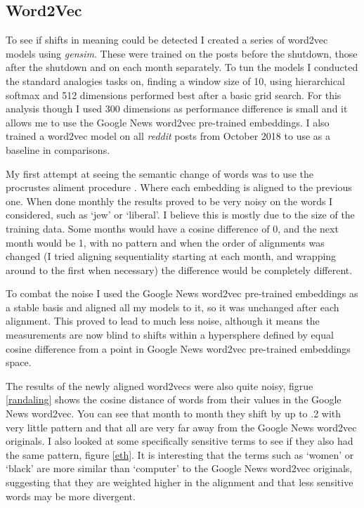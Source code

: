\documentclass[letterpaper]{article}
\begin{document}
\subsection{Word2Vec}

To see if shifts in meaning could be detected I created a series of word2vec \cite{mikolov2013efficient} models using \textit{gensim}\cite{rehurek_lrec}. These were trained on the posts before the shutdown, those after the shutdown and on each month separately. To tun the models I conducted the standard analogies tasks on, finding a window size of 10, using hierarchical softmax and 512 dimensions performed best after a basic grid search. For this analysis though I used 300 dimensions as performance difference is small and it allows me to use the Google News word2vec pre-trained embeddings. I also trained a word2vec model on all \textit{reddit} posts from October 2018 to use as a baseline in comparisons.

My first attempt at seeing the semantic change of words was to use the procrustes aliment procedure \cite{hamilton2016diachronic}. Where each embedding is aligned to the previous one. When done monthly the results proved to be very noisy on the words I considered, such as `jew' or `liberal'. I believe this is mostly due to the size of the training data. Some months would have a cosine difference of 0, and the next month would be 1, with no pattern and when the order of alignments was changed (I tried aligning sequentiality starting at each month, and wrapping around to the first when necessary) the difference would be completely different.

To combat the noise I used the Google News word2vec pre-trained embeddings as a stable basis and aligned all my models to it, so it was unchanged after each alignment. This proved to lead to much less noise, although it means the measurements are now blind to shifts within a hypersphere defined by equal cosine difference from a point in Google News word2vec pre-trained embeddings space.

The results of the newly aligned word2vecs were also quite noisy, figrue \ref{randaling} shows the cosine distance of words from their values in the Google News word2vec. You can see that month  to month they shift by up to .2 with very little pattern and that all are very far away from the Google News word2vec originals. I also looked at some specifically sensitive terms to see if they also had the same pattern, figure \ref{eth}. It is interesting that the terms such as `women' or `black' are more similar than `computer' to the Google News word2vec originals, suggesting that they are weighted higher in the alignment and that less sensitive words may be more divergent.
\end{document}
